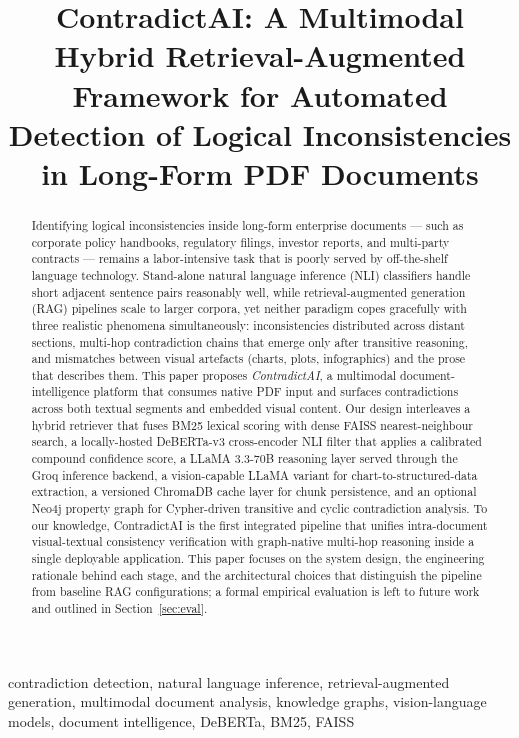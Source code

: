 \documentclass[conference]{IEEEtran}
\begin{document}
\title{ContradictAI: A Multimodal Hybrid Retrieval-Augmented Framework for Automated Detection of Logical Inconsistencies in Long-Form PDF Documents}
\author{
}
\maketitle
\begin{abstract}
Identifying logical inconsistencies inside long-form enterprise documents --- such as corporate policy handbooks, regulatory filings, investor reports, and multi-party contracts --- remains a labor-intensive task that is poorly served by off-the-shelf language technology. Stand-alone natural language inference (NLI) classifiers handle short adjacent sentence pairs reasonably well, while retrieval-augmented generation (RAG) pipelines scale to larger corpora, yet neither paradigm copes gracefully with three realistic phenomena simultaneously: inconsistencies distributed across distant sections, multi-hop contradiction chains that emerge only after transitive reasoning, and mismatches between visual artefacts (charts, plots, infographics) and the prose that describes them. This paper proposes \emph{ContradictAI}, a multimodal document-intelligence platform that consumes native PDF input and surfaces contradictions across both textual segments and embedded visual content. Our design interleaves a hybrid retriever that fuses BM25 lexical scoring with dense FAISS nearest-neighbour search, a locally-hosted DeBERTa-v3 cross-encoder NLI filter that applies a calibrated compound confidence score, a LLaMA 3.3-70B reasoning layer served through the Groq inference backend, a vision-capable LLaMA variant for chart-to-structured-data extraction, a versioned ChromaDB cache layer for chunk persistence, and an optional Neo4j property graph for Cypher-driven transitive and cyclic contradiction analysis. To our knowledge, ContradictAI is the first integrated pipeline that unifies intra-document visual-textual consistency verification with graph-native multi-hop reasoning inside a single deployable application. This paper focuses on the system design, the engineering rationale behind each stage, and the architectural choices that distinguish the pipeline from baseline RAG configurations; a formal empirical evaluation is left to future work and outlined in Section~\ref{sec:eval}.
\end{abstract}
\begin{IEEEkeywords}
contradiction detection, natural language inference, retrieval-augmented generation, multimodal document analysis, knowledge graphs, vision-language models, document intelligence, DeBERTa, BM25, FAISS
\end{IEEEkeywords}
\end{document}
